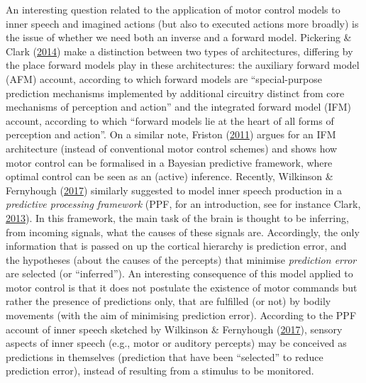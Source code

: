 \documentclass[a4paper,12pt,twoside,onecolumn,openright,final,oldfontcommands]{memoir}
\begin{document}
An interesting question related to the application of motor control models to inner speech and imagined actions (but also to executed actions more broadly) is the issue of whether we need both an inverse and a forward model. Pickering \& Clark (\protect\hyperlink{ref-pickering_getting_2014}{2014}) make a distinction between two types of architectures, differing by the place forward models play in these architectures: the auxiliary forward model (AFM) account, according to which forward models are \enquote{special-purpose prediction mechanisms implemented by additional circuitry distinct from core mechanisms of perception and action} and the integrated forward model (IFM) account, according to which \enquote{forward models lie at the heart of all forms of perception and action}. On a similar note, Friston (\protect\hyperlink{ref-friston_what_2011}{2011}) argues for an IFM architecture (instead of conventional motor control schemes) and shows how motor control can be formalised in a Bayesian predictive framework, where optimal control can be seen as an (active) inference. Recently, Wilkinson \& Fernyhough (\protect\hyperlink{ref-wilkinson_auditory_2017}{2017}) similarly suggested to model inner speech production in a \emph{predictive processing framework} (PPF, for an introduction, see for instance Clark, \protect\hyperlink{ref-clark_whatever_2013}{2013}). In this framework, the main task of the brain is thought to be inferring, from incoming signals, what the causes of these signals are. Accordingly, the only information that is passed on up the cortical hierarchy is prediction error, and the hypotheses (about the causes of the percepts) that minimise \emph{prediction error} are selected (or \enquote{inferred}). An interesting consequence of this model applied to motor control is that it does not postulate the existence of motor commands but rather the presence of predictions only, that are fulfilled (or not) by bodily movements (with the aim of minimising prediction error). According to the PPF account of inner speech sketched by Wilkinson \& Fernyhough (\protect\hyperlink{ref-wilkinson_auditory_2017}{2017}), sensory aspects of inner speech (e.g., motor or auditory percepts) may be conceived as predictions in themselves (prediction that have been \enquote{selected} to reduce prediction error), instead of resulting from a stimulus to be monitored.
\end{document}
